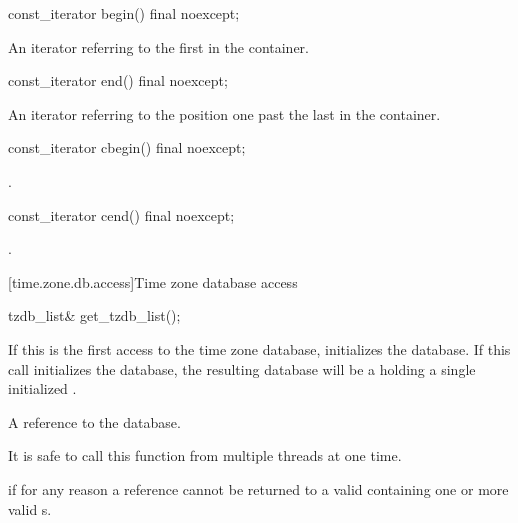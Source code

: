%
\begin{itemdecl}
const_iterator begin() final noexcept;
\end{itemdecl}

\begin{itemdescr}
\pnum
\returns
An iterator referring to the first  in the container.
\end{itemdescr}

%
\begin{itemdecl}
const_iterator end() final noexcept;
\end{itemdecl}

\begin{itemdescr}
\pnum
\returns
An iterator referring to the position one past the last  in the container.
\end{itemdescr}

%
\begin{itemdecl}
const_iterator cbegin() final noexcept;
\end{itemdecl}

\begin{itemdescr}
\pnum
\returns {}.
\end{itemdescr}

%
\begin{itemdecl}
const_iterator cend() final noexcept;
\end{itemdecl}

\begin{itemdescr}
\pnum
\returns {}.
\end{itemdescr}

[time.zone.db.access]{Time zone database access}

%
\begin{itemdecl}
tzdb_list& get_tzdb_list();
\end{itemdecl}

\begin{itemdescr}
\pnum
\effects
If this is the first access to the time zone database,
initializes the database.
If this call initializes the database,
the resulting database will be a 
holding a single initialized .

\pnum
\returns
A reference to the database.

\pnum
\remarks
It is safe to call this function from multiple threads at one time.

\pnum
\throws
{} if for any reason
a reference cannot be returned to a valid 
containing one or more valid s.
\end{itemdescr}


